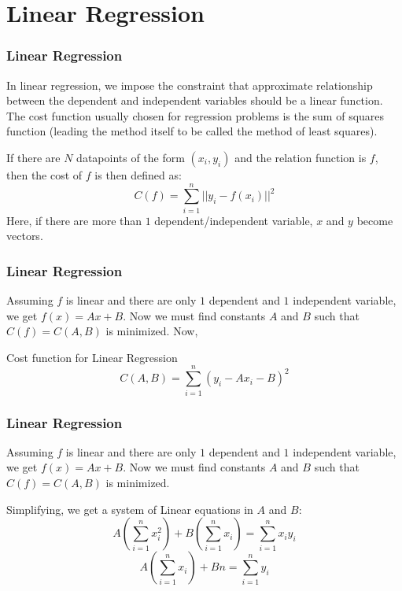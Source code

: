 \documentclass{beamer}
\begin{document}
    \section{Linear Regression}

    \begin{frame}
        \frametitle{Linear Regression}
        In linear regression, we impose the constraint that approximate relationship between the dependent and independent variables should be a linear 
        function. The cost function usually chosen for regression problems is the sum of squares function (leading the method itself to be called the 
        method of least squares). 

        If there are $N$ datapoints of the form $(x_{i}, y_{i})$ and the relation function is $f$, then the cost of $f$ is then  defined as:
        \begin{equation}
            C(f) = \sum_{i = 1}^{n} ||y_{i} - f(x_{i})||^{2}
        \end{equation}
        Here, if there are more than $1$ dependent/independent variable, $x$ and $y$ become vectors.
    \end{frame}

    \begin{frame}
        \frametitle{Linear Regression}
        Assuming $f$ is linear and there are only $1$ dependent and $1$ independent variable, we get $f(x) = Ax + B$. 
        Now we must find constants $A$ and $B$ such that $C(f) = C(A, B)$ is minimized. Now,
        \begin{block}{Cost function for Linear Regression}
            \begin{equation}
                C(A, B) = \sum_{i = 1}^{n} (y_{i} - Ax_{i} - B)^{2}
            \end{equation}
        \end{block}
    \end{frame}

    \begin{frame}
        \frametitle{Linear Regression}
        Assuming $f$ is linear and there are only $1$ dependent and $1$ independent variable, we get $f(x) = Ax + B$. 
        Now we must find constants $A$ and $B$ such that $C(f) = C(A, B)$ is minimized.


        Simplifying, we get a system of Linear equations in $A$ and $B$:
        \begin{equation}
            A(\sum_{i = 1}^{n} x_{i}^{2}) + B(\sum_{i = 1}^{n} x_{i}) = \sum_{i = 1}^{n} x_{i}y_{i}
        \end{equation}
        \begin{equation}
            A(\sum_{i = 1}^{n} x_{i}) + Bn = \sum_{i = 1}^{n} y_{i}
        \end{equation}

    \end{frame}
\end{document}

